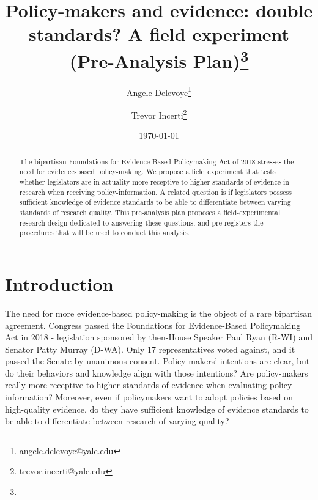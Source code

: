 \documentclass[12pt,final,fleqn]{article}
\theoremstyle{plain}
\begin{document}
\singlespace
\title{\textbf{Policy-makers and evidence: double standards? A field experiment \\
(Pre-Analysis Plan)}\vspace{-1ex}\thanks{}}
\author{Angele Delevoye\thanks{angele.delevoye@yale.edu}\vspace{-1ex}}
\author{Trevor Incerti\thanks{trevor.incerti@yale.edu}\vspace{-1ex}}
\date{\today}
\maketitle

\begin{abstract}
\noindent
The bipartisan Foundations for Evidence-Based Policymaking Act of 2018 stresses the need for evidence-based policy-making. We propose a field experiment that tests whether legislators are in actuality more receptive to higher standards of evidence in research when receiving policy-information. A related question is if legislators possess sufficient knowledge of evidence standards to be able to differentiate between varying standards of research quality. This pre-analysis plan proposes a field-experimental research design dedicated to answering these questions, and pre-registers the procedures that will be used to conduct this analysis.
\end{abstract}

\pagebreak

\doublespace

\begin{center}
\end{center}

\section{Introduction} \label{sec:Introduction}

The need for more evidence-based policy-making is the object of a rare bipartisan agreement. Congress passed the Foundations for Evidence-Based Policymaking Act in 2018 - legislation sponsored by then-House Speaker Paul Ryan (R-WI) and Senator Patty Murray (D-WA). Only 17 representatives voted against, and it passed the Senate by unanimous consent. Policy-makers' intentions are clear, but do their behaviors and knowledge align with those intentions? Are policy-makers really more receptive to higher standards of evidence when evaluating policy-information? Moreover, even if policymakers want to adopt policies based on high-quality evidence, do they have sufficient knowledge of evidence standards to be able to differentiate between research of varying quality? 
\end{document}
